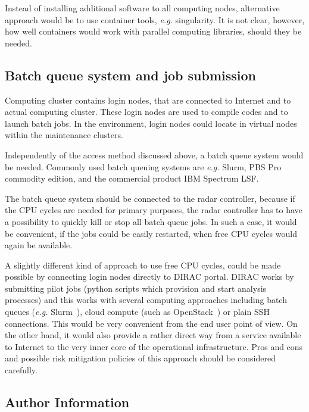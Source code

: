 \documentclass[12pt,a4paper]{article}
\begin{document}
Instead of installing additional software to all computing nodes,  alternative approach would be to use container tools, \emph{e.g.} singularity. 
It is not clear, however, how well containers would work with parallel computing libraries, should they be needed.

\subsection{Batch queue system and job submission}

Computing cluster contains login nodes, that are connected to Internet and to actual computing cluster. These login nodes are used to compile codes and to launch batch jobs. In the \ED environment, login nodes could locate in virtual nodes within the maintenance clusters. 

Independently of the access method discussed above, a batch queue system would be needed. Commonly used batch queuing systems are \emph{e.g.} Slurm, PBS Pro commodity edition, and the commercial product IBM Spectrum LSF. 

The batch queue system should be connected to the \ED radar controller, because if the CPU cycles are needed for primary purposes, 
the radar controller has to have a possibility to quickly kill or stop all batch queue jobs. In such a case, it would be convenient, if the jobs could be easily restarted, when free CPU cycles would again be available.

A slightly different kind of approach to use free CPU cycles, could be made possible by connecting login nodes directly to DIRAC portal. 
DIRAC works by submitting pilot jobs (python scripts which provision and start analysis processes) and this works with several computing approaches including batch queues (\emph{e.g.} Slurm~\cite{slurm}), cloud compute (such as OpenStack~\cite{openstack}) or plain SSH connections. 
This would be very convenient from the end user point of view. 
On the other hand, it would also provide a rather direct way from a service available to Internet to the very inner core of the operational \ED infrastructure. 
Pros and cons and possible risk mitigation policies of this approach should be considered  carefully.

\newpage
{}


\newpage
\begin{appendices}
\section{Author Information}
\label{app:authors}

\end{appendices}
\end{document}
